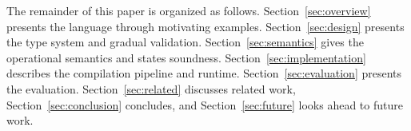 The remainder of this paper is organized as follows.
Section~\ref{sec:overview} presents the language through motivating
examples. Section~\ref{sec:design} presents the type system and gradual
validation. Section~\ref{sec:semantics} gives the operational semantics
and states soundness. Section~\ref{sec:implementation} describes the
compilation pipeline and runtime. Section~\ref{sec:evaluation}
presents the evaluation.
Section~\ref{sec:related} discusses related work,
Section~\ref{sec:conclusion} concludes, and Section~\ref{sec:future} looks ahead to future work.